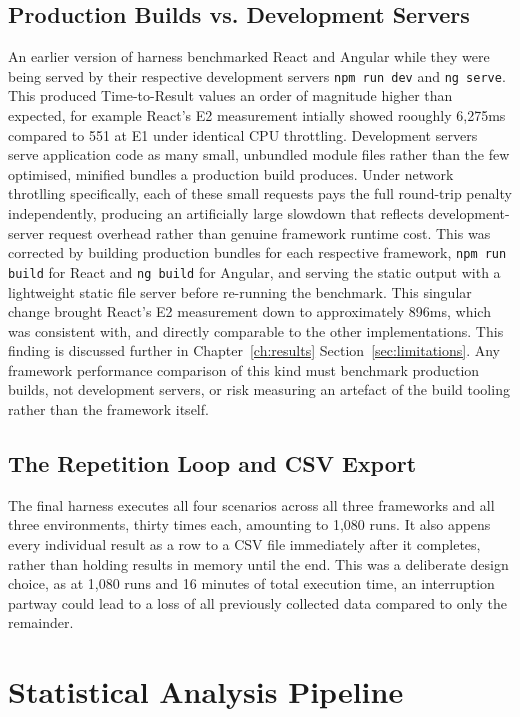 \documentclass[11pt,a4paper]{report}
\begin{document}
\subsection{Production Builds vs. Development Servers}

An earlier version of harness benchmarked React and Angular while they were being served by their respective development servers \texttt{npm run dev} and \texttt{ng serve}. This produced Time-to-Result values an order of magnitude higher than expected, for example React's E2 measurement intially showed rooughly 6,275ms compared to 551 at E1 under identical CPU throttling. Development servers serve application code as many small, unbundled module files rather than the few optimised, minified bundles a production build produces. Under network throtlling specifically, each of these small requests pays the full round-trip penalty independently, producing an artificially large slowdown that reflects development-server request overhead rather than genuine framework runtime cost. This was corrected by building production bundles for each respective framework, \texttt{npm run build} for React and \texttt{ng build} for Angular, and serving the static output with a lightweight static file server before re-running the benchmark. This singular change brought React's E2 measurement down to approximately 896ms, which was consistent with, and directly comparable to the other implementations. This finding is discussed further in Chapter~\ref{ch:results} Section~\ref{sec:limitations}. Any framework
performance comparison of this kind must benchmark production builds, not development servers, or risk measuring an artefact of the build tooling rather than the framework itself.

\subsection{The Repetition Loop and CSV Export}

The final harness executes all four scenarios across all three frameworks and all three environments, thirty times each, amounting to 1,080 runs. It also appens every individual result as a row to a CSV file immediately after it completes, rather than holding results in memory until the end. This was a deliberate design choice, as at 1,080 runs and 16 minutes of total execution time, an interruption partway could lead to a loss of all previously collected data compared to only the remainder. 

\section{Statistical Analysis Pipeline}
\end{document}
